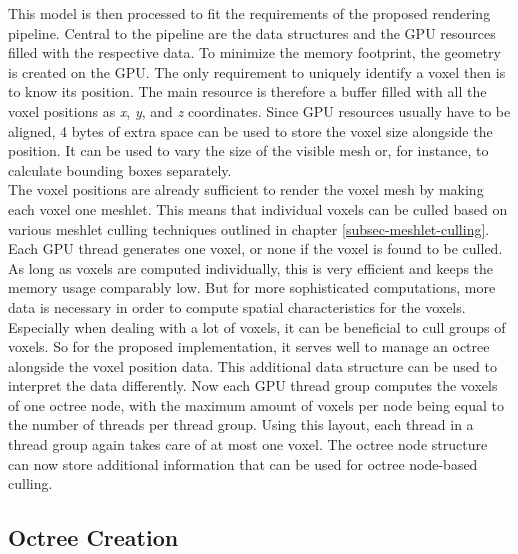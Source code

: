 \noindent
This model is then processed to fit the requirements of the proposed rendering pipeline. Central to the pipeline 
are the data structures and the \ac{GPU} resources filled with the respective data. To minimize the memory footprint,
the geometry is created on the \ac{GPU}. The only requirement to uniquely identify a voxel then is to know its position.
The main resource is therefore a buffer filled with all the voxel positions as \emph{x}, \emph{y}, and \emph{z} coordinates. 
Since \ac{GPU} resources usually have to be aligned, 4 bytes of extra space can be used to store the voxel size 
alongside the position. It can be used to vary the size of the visible mesh or, for instance, to calculate bounding 
boxes separately. \\

\noindent
The voxel positions are already sufficient to render the voxel mesh by making each voxel one meshlet. This means that 
individual voxels can be culled based on various meshlet culling techniques outlined in chapter 
\ref{subsec-meshlet-culling}. Each \ac{GPU} thread generates one voxel, or none if the voxel is found to be culled. 
As long as voxels are computed individually, this is very efficient and keeps the memory usage comparably low. But for 
more sophisticated computations, more data is necessary in order to compute spatial characteristics for the voxels. \\

\noindent
Especially when dealing with a lot of voxels, it can be beneficial to cull groups of voxels. So for the proposed 
implementation, it serves well to manage an octree alongside the voxel position data. This additional data structure 
can be used to interpret the data differently. Now each \ac{GPU} thread group computes the voxels of one octree node, 
with the maximum amount of voxels per node being equal to the number of threads per thread group. Using this layout, 
each thread in a thread group again takes care of at most one voxel. The octree node structure can now store additional 
information that can be used for octree node-based culling.

\subsection*{Octree Creation} \label{subsec-octree-creation}

